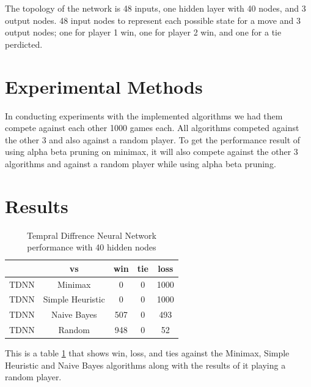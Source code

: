 \documentclass[12pt,letterpaper]{article}
\begin{document}
The topology of the network is 48 inputs, one hidden layer with 40 nodes, and 3 output nodes. 48 input nodes to represent each possible state for a move and 3 output nodes; one for player 1 win, one for player 2 win, and one for a tie perdicted. 

\section{Experimental Methods}
In conducting experiments with the implemented algorithms we had them compete against each other 1000 games each. All algorithms competed against the other 3 and also against a random player. To get the performance result of using alpha beta pruning on minimax, it will also compete against the other 3 algorithms and against a random player while using alpha beta pruning. 


\clearpage
\newpage

\section{Results}

\begin{table}[h]
\begin{center}
\begin{tabular}{|c||c|c|c|c|}
\hline
& vs & win & tie & loss\\
\hline \hline
TDNN & Minimax & 0 & 0 & 1000\\
\hline 
TDNN & Simple Heuristic & 0 & 0 & 1000\\
\hline 
TDNN & Naive Bayes & 507 & 0 & 493\\
\hline 
TDNN & Random & 948 & 0 & 52\\
\hline 
\end{tabular}
\end{center}
\caption{Tempral Diffrence Neural Network performance with 40 hidden nodes}
\label{TDNNtable}
\end{table}

This is a table \ref{TDNNtable} that shows win, loss, and ties against the Minimax, Simple Heuristic and Naive Bayes algorithms along with the results of it playing a random player.
\end{document}
